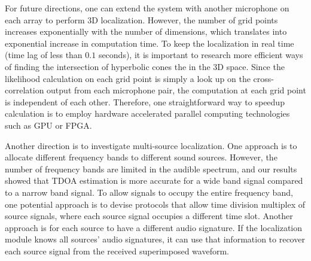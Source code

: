 For future directions, one can extend the system with another microphone on each array to perform 3D localization. However, the number of grid points increases exponentially with the number of dimensions, which translates into exponential increase in computation time. To keep the localization in real time (time lag of less than $0.1$ seconds), it is important to research more efficient ways of finding the intersection of hyperbolic cones the in the 3D space. Since the likelihood calculation on each grid point is simply a look up on the cross-correlation output from each microphone pair, the computation at each grid point is independent of each other. Therefore, one straightforward way to speedup calculation is to employ hardware accelerated parallel computing technologies such as GPU or FPGA. 

Another direction is to investigate multi-source localization. One approach is to allocate different frequency bands to different sound sources. However, the number of frequency bands are limited in the audible spectrum, and our results showed that TDOA estimation is more accurate for a wide band signal compared to a narrow band signal. To allow signals to occupy the entire frequency band, one potential approach is to devise protocols that allow time division multiplex of source signals, where each source signal occupies a different time slot. Another approach is for each source to have a different audio signature. If the localization module knows all sources' audio signatures, it can use that information to recover each source signal from the received superimposed waveform.
